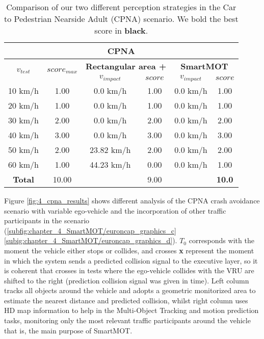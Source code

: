 \begin{table}[h]
	\centering
	\caption{Comparison of our two different perception strategies in the Car to Pedestrian Nearside Adult (CPNA) scenario. We bold the best score in \textbf{black}.}
	\label{table:4_CPNA_results}
	\begin{tabular}{c | c | c  c | c  c  } 
		\hline 
		\multicolumn{6}{c}{\textbf{CPNA}}\\
		\hline \hline
		\multirow{2}{*}{\textbf{\(v_{test}\)}} & \multirow{2}{*}{\textbf{\(score_{max}\)}} & \multicolumn{2}{c}{\textbf{Rectangular area + \cite{gomez2020real}}} & \multicolumn{2}{c}{\textbf{SmartMOT}} \\ 
		& & \(v_{impact}\) & \(score\) & \(v_{impact}\) & \(score\) \\
		\hline
		10 km/h & 1.00 & 0.0 km/h & 1.00 & 0.0 km/h & 1.00 \\
		20 km/h & 1.00 & 0.0 km/h & 1.00 & 0.0 km/h & 1.00 \\
		30 km/h & 2.00 & 0.0 km/h & 2.00 & 0.0 km/h & 2.00 \\
		40 km/h & 3.00 & 0.0 km/h & 3.00 & 0.0 km/h & 3.00 \\
		50 km/h & 2.00 & 23.82 km/h & 2.00 & 0.0 km/h & 2.00 \\
		60 km/h & 1.00 & 44.23 km/h & 0.00 & 0.0 km/h & 1.00  \\
		\hline \hline
		\textbf{Total} & 10.00 &  & 9.00 & & \textbf{10.0} \\
		\hline
	\end{tabular}
\end{table}

Figure \ref{fig:4_cpna_results} shows different analysis of the CPNA crash avoidance scenario with variable ego-vehicle and the incorporation of other traffic participants in the scenario (\ref{subfig:chapter_4_SmartMOT/euroncap_graphics_c} \ref{subig:chapter_4_SmartMOT/euroncap_graphics_d}). \(T_0\) corresponds with the moment the vehicle either stops or collides, and crosses \textbf{x} represent the moment in which the system sends a predicted collision signal to the executive layer, so it is coherent that crosses in tests where the ego-vehicle collides with the VRU are shifted to the right (prediction collision signal was given in time). Left column tracks all objects around the vehicle and adopts a geometric monitorized area to estimate the nearest distance and predicted collision, whilst right column uses HD map information to help in the Multi-Object Tracking and motion prediction tasks, monitoring only the most relevant traffic participants around the vehicle that is, the main purpose of SmartMOT.

